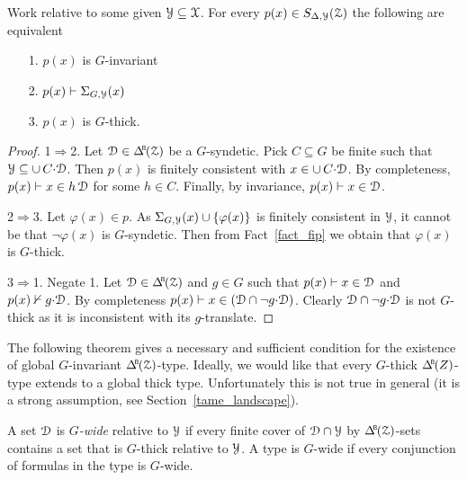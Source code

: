 \begin{theorem}\label{thm_syndetic_invariant}
  Work relative to some given $\EuScript Y\subseteq\EuScript X$.
  For every $p(x)\in S_{\Delta,\EuScript Y}(\EuScript Z)$ the following are equivalent
  \begin{itemize}
    \item[1.] $p(x)$ is $G$-invariant
    \item[2.] $p(x)\vdash\Sigma_{G,\EuScript Y}(x)$
    \item[3.] $p(x)$ is $G$-thick.
  \end{itemize}
\end{theorem}

\begin{proof}
  1$\Rightarrow$2.
  Let $\D\in\BDelta(\Z)$ be a $G$-syndetic.
  Pick $C\subseteq G$ be finite such that $\EuScript Y\subseteq\cup\,C{\cdot}\EuScript D$.
  Then $p(x)$ is finitely consistent with $x\in\cup\,C{\cdot}\EuScript D$.
  By completeness, $p(x)\vdash x\in h\,\EuScript D$ for some $h\in C$.
  Finally, by invariance, $p(x)\vdash x\in\EuScript D$.
  
  2$\Rightarrow$3.
  Let $\varphi(x)\in p$.
  As $\Sigma_{G,\EuScript Y}(x)\cup\{\varphi(x)\}$ is finitely consistent in $\EuScript Y$, it cannot be that $\neg\varphi(x)$ is $G$-syndetic.
  Then from Fact~\ref{fact_fip} we obtain that $\varphi(x)$ is $G$-thick.

  3$\Rightarrow$1.
  Negate 1.
  Let $\D\in\BDelta(\Z)$ and $g\in G$ such that $p(x)\vdash x\in\EuScript D$ and $p(x)\nvdash g{\cdot}\EuScript D$.
  By completeness $p(x)\vdash x\in(\EuScript D\cap\neg g{\cdot}\EuScript D)$.
  Clearly $\EuScript D\cap \neg g{\cdot}\EuScript D$ is not $G$-thick as it is inconsistent with its $g$-translate.
\end{proof}


The following theorem gives a necessary and sufficient condition for the  existence of global $G$-invariant $\BDelta(\Z)$-type.
Ideally, we would like that every $G$-thick $\BDelta(Z)$-type extends to a global thick type.
Unfortunately this is not true in general (it is a strong assumption, see Section~\ref{tame_landscape}).

A set $\EuScript D$ is \emph{$G$-wide\/} relative to $\EuScript Y$ if every finite cover of $\EuScript D\cap\EuScript Y$ by $\BDelta(\Z)$-sets contains a set that is $G$-thick relative to $\EuScript Y$.
A type is $G$-wide if every conjunction of formulas in the type is $G$-wide.


